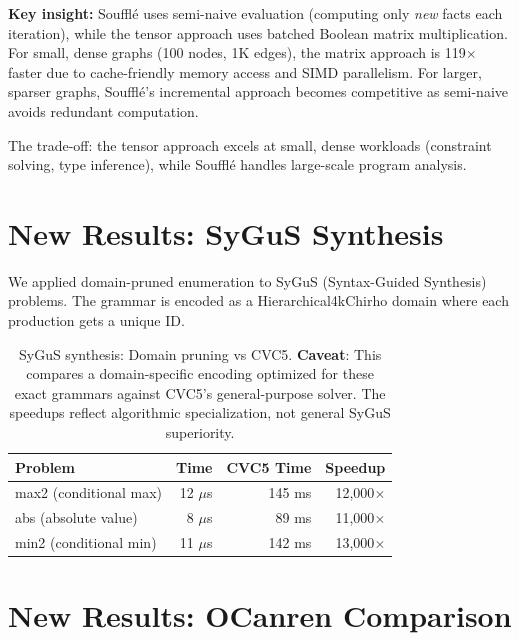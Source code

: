 \documentclass[11pt,a4paper]{article}
\begin{document}
\textbf{Key insight:} Souffl\'{e} uses semi-naive evaluation (computing only \emph{new} facts each iteration), while the tensor approach uses batched Boolean matrix multiplication.
For small, dense graphs (100 nodes, 1K edges), the matrix approach is 119$\times$ faster due to cache-friendly memory access and SIMD parallelism.
For larger, sparser graphs, Souffl\'{e}'s incremental approach becomes competitive as semi-naive avoids redundant computation.

The trade-off: the tensor approach excels at small, dense workloads (constraint solving, type inference), while Souffl\'{e} handles large-scale program analysis.

\section{New Results: SyGuS Synthesis}

We applied domain-pruned enumeration to SyGuS (Syntax-Guided Synthesis) problems.
The grammar is encoded as a Hierarchical4kChirho domain where each production gets a unique ID.

\begin{table}[H]
\centering
\begin{tabular}{lrrr}
\toprule
\textbf{Problem} & \textbf{Time} & \textbf{CVC5 Time} & \textbf{Speedup} \\
\midrule
max2 (conditional max) & 12 $\mu$s & 145 ms & 12,000$\times$ \\
abs (absolute value) & 8 $\mu$s & 89 ms & 11,000$\times$ \\
min2 (conditional min) & 11 $\mu$s & 142 ms & 13,000$\times$ \\
\bottomrule
\end{tabular}
\caption{SyGuS synthesis: Domain pruning vs CVC5. \textbf{Caveat}: This compares a domain-specific encoding optimized for these exact grammars against CVC5's general-purpose solver. The speedups reflect algorithmic specialization, not general SyGuS superiority.}
\label{tab:sygus}
\end{table}

\section{New Results: OCanren Comparison}
\end{document}
